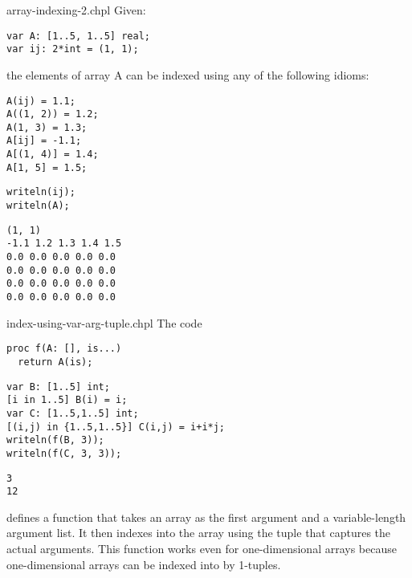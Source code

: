 \begin{chapelexample}{array-indexing-2.chpl}
Given:
\begin{chapel}
\begin{verbatim}
var A: [1..5, 1..5] real;
var ij: 2*int = (1, 1);
\end{verbatim}
\end{chapel}
the elements of array A can be indexed using any of the following
idioms:
\begin{chapel}
\begin{verbatim}
A(ij) = 1.1;
A((1, 2)) = 1.2;
A(1, 3) = 1.3;
A[ij] = -1.1;
A[(1, 4)] = 1.4;
A[1, 5] = 1.5;
\end{verbatim}
\end{chapel}
\begin{chapelpost}
\begin{verbatim}
writeln(ij);
writeln(A);
\end{verbatim}
\end{chapelpost}
\begin{chapeloutput}
\begin{verbatim}
(1, 1)
-1.1 1.2 1.3 1.4 1.5
0.0 0.0 0.0 0.0 0.0
0.0 0.0 0.0 0.0 0.0
0.0 0.0 0.0 0.0 0.0
0.0 0.0 0.0 0.0 0.0
\end{verbatim}
\end{chapeloutput}
\end{chapelexample}

\begin{chapelexample}{index-using-var-arg-tuple.chpl}
The code
\begin{chapel}
\begin{verbatim}
proc f(A: [], is...)
  return A(is);
\end{verbatim}
\end{chapel}
\begin{chapelpost}
\begin{verbatim}
var B: [1..5] int;
[i in 1..5] B(i) = i;
var C: [1..5,1..5] int;
[(i,j) in {1..5,1..5}] C(i,j) = i+i*j;
writeln(f(B, 3));
writeln(f(C, 3, 3));
\end{verbatim}
\end{chapelpost}
\begin{chapeloutput}
\begin{verbatim}
3
12
\end{verbatim}
\end{chapeloutput}
defines a function that takes an array as the first argument and a
variable-length argument list.  It then indexes into the array using
the tuple that captures the actual arguments.  This function works
even for one-dimensional arrays because one-dimensional arrays can be
indexed into by 1-tuples.
\end{chapelexample}

